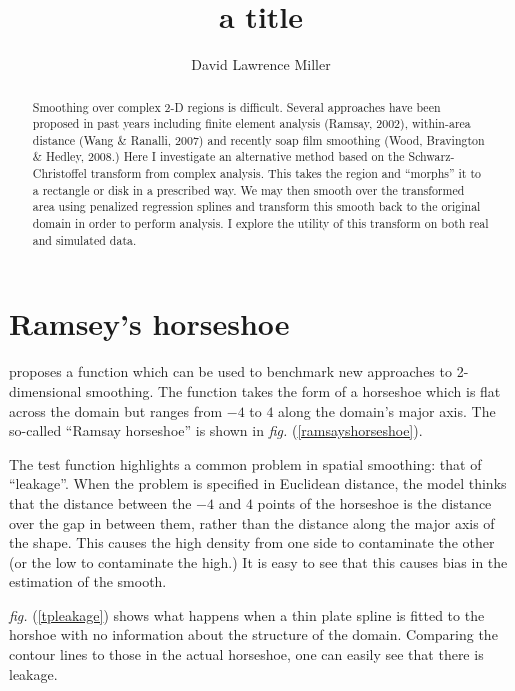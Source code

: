 \documentclass[a4paper,10pt]{amsart}
\title{a title}
\author{David Lawrence Miller}
\newcommand{\fig}[1]{\emph{fig.} (\ref{#1})}
\begin{document}
\begin{abstract}
Smoothing over complex 2-D regions is difficult. Several approaches have been proposed in past years including finite element analysis (Ramsay, 2002), within-area distance (Wang \& Ranalli, 2007) and recently soap film smoothing (Wood, Bravington \& Hedley, 2008.) Here I investigate an alternative method based on the Schwarz-Christoffel transform from complex analysis. This takes the region and ``morphs'' it to a rectangle or disk in a prescribed way. We may then smooth over the transformed area using penalized regression splines and transform this smooth back to the original domain in order to perform analysis. I explore the utility of this transform on both real and simulated data.
\end{abstract}


\newtheorem{thm}{Theorem}[section]

\newtheorem{defn}{Definition}[section]

\maketitle



\section{Ramsey's horseshoe}

\cite{ramsay} proposes a function which can be used to benchmark new approaches to 2-dimensional smoothing. The function takes the form of a horseshoe which is flat across the domain but ranges from $-4$ to $4$ along the domain's major axis. The so-called ``Ramsay horseshoe'' is shown in \fig{ramsayshorseshoe}.

The test function highlights a common problem in spatial smoothing: that of ``leakage''. When the problem is specified in Euclidean distance, the model thinks that the distance between the $-4$ and $4$ points of the horseshoe is the distance over the gap in between them, rather than the distance along the major axis of the shape. This causes the high density from one side to contaminate the other (or the low to contaminate the high.) It is easy to see that this causes bias in the estimation of the smooth.

\fig{tpleakage} shows what happens when a thin plate spline is fitted to the horshoe with no information about the structure of the domain. Comparing the contour lines to those in the actual horseshoe, one can easily see that there is leakage.
\end{document}
